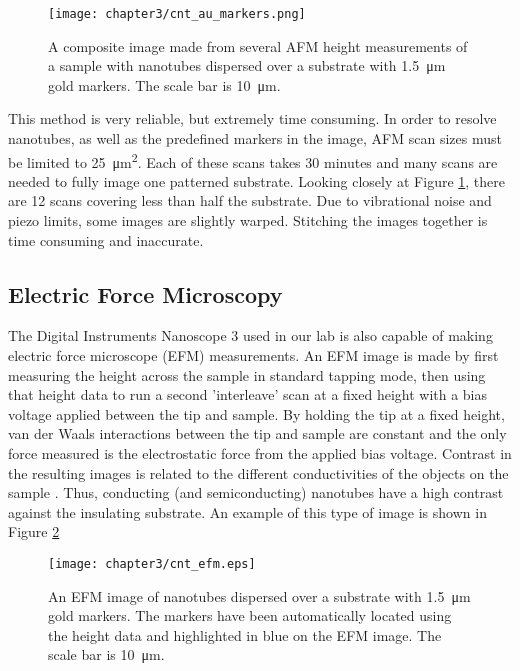 \begin{figure}
	\centering
	\texttt{[image: chapter3/cnt\_au\_markers.png]}
	\caption{A composite image made from several AFM height measurements of a sample with nanotubes dispersed over a  substrate with \SI{1.5}{\micro\meter} gold markers. The scale bar is \SI{10}{\micro\meter}.}
	\label{fig:cnt_au_markers}
\end{figure}

This method is very reliable, but extremely time consuming. In order to resolve nanotubes, as well as the predefined markers in the image, AFM scan sizes must be limited to \SI{25}{\square\micro\meter}. Each of these scans takes 30 minutes and many scans are needed to fully image one patterned substrate. Looking closely at Figure \ref{fig:cnt_au_markers}, there are 12 scans covering less than half the substrate. Due to vibrational noise and piezo limits, some images are slightly warped. Stitching the images together is time consuming and inaccurate.

\subsection{Electric Force Microscopy}
\label{subsec:EFM}

The Digital Instruments Nanoscope 3 used in our lab is also capable of making electric force microscope (EFM) measurements. An EFM image is made by first measuring the height across the sample in standard tapping mode, then using that height data to run a second 'interleave' scan at a fixed height with a bias voltage applied between the tip and sample. By holding the tip at a fixed height, van der Waals interactions between the tip and sample are constant and the only force measured is the electrostatic force from the applied bias voltage. Contrast in the resulting images is related to the different conductivities of the objects on the sample \cite{Bockrath2002}. Thus, conducting (and semiconducting) nanotubes have a high contrast against the insulating  substrate. An example of this type of image is shown in Figure \ref{fig:cnt_efm}

\begin{figure}
	\centering
	\texttt{[image: chapter3/cnt\_efm.eps]}
	\caption{An EFM image of nanotubes dispersed over a substrate with \SI{1.5}{\micro\meter} gold markers. The markers have been automatically located using the height data and highlighted in blue on the EFM image. The scale bar is \SI{10}{\micro\meter}.}
	\label{fig:cnt_efm}
\end{figure}

